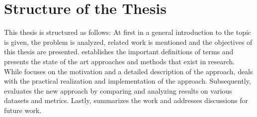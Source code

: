 \section{Structure of the Thesis}
\label{sec:structure_of_thesis}

This thesis is structured as follows:
At first in \textbf{} a general introduction to the topic is given, the problem is analyzed, related work is mentioned and the objectives of this thesis are presented.
\textbf{} establishes the important definitions of terms and presents the state of the art approaches and methods that exist in research.
While \textbf{} focuses on the motivation and a detailed description of the approach, \textbf{} deals with the practical realization and implementation of the approach.
Subsequently, \textbf{} evaluates the new approach by comparing and analyzing results on various datasets and metrics.
Lastly, \textbf{} summarizes the work and addresses discussions for future work.